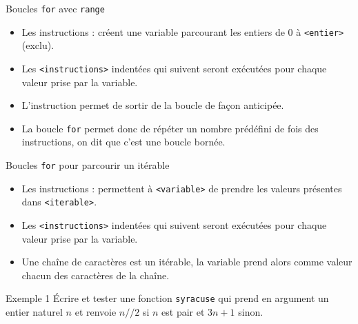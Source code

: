 \documentclass[10pt]{beamer}
\begin{document}
\begin{frame}[fragile]{\Ctitle}{\stitle}
	\begin{alertblock}{Boucles {\tt for} avec {\tt range}}
		\begin{itemize}
			\item<2-> Les instructions :
				créent une variable parcourant les entiers de 0 à {\tt <entier>} (exclu).
			\item<3-> Les {\tt <instructions>} indentées qui suivent seront exécutées pour chaque valeur prise par la variable.
			\item<4-> L'instruction  permet de sortir de la boucle de façon anticipée.
			\item<5-> La boucle {\tt for} permet donc de répéter un nombre prédéfini de fois des instructions, on dit que c'est une boucle bornée.
		\end{itemize}
	\end{alertblock}
\end{frame}


\begin{frame}[fragile]{\Ctitle}{\stitle}
	\begin{alertblock}{Boucles {\tt for} pour parcourir un itérable}
		\begin{itemize}
			\item<2-> Les instructions :
				permettent à {\tt <variable>} de prendre les valeurs présentes dans {\tt <iterable>}.
			\item<3-> Les {\tt <instructions>} indentées qui suivent seront exécutées pour chaque valeur prise par la variable.
			\item<4-> Une chaîne de caractères est un itérable, la variable prend alors comme valeur chacun des caractères de la chaîne.
		\end{itemize}
	\end{alertblock}
\end{frame}

\begin{frame}[fragile]{\Ctitle}{\stitle}
	\begin{exampleblock}{Exemple 1}
		Écrire et tester une fonction {\tt syracuse} qui prend en argument un entier naturel $n$ et renvoie $n//2$ si $n$ est pair et $3n+1$ sinon. \\
		\onslide<2->
	\end{exampleblock}
\end{frame}
\end{document}
